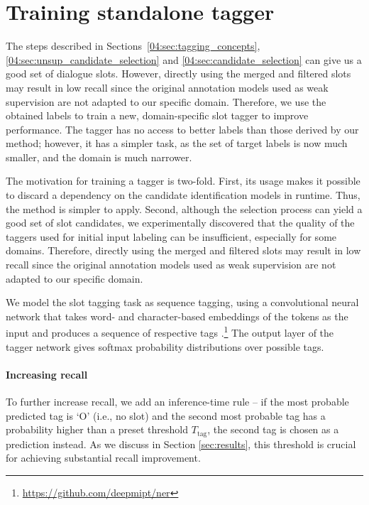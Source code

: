 \section{Training standalone tagger}
\label{04:sec:training_tagger}
The steps described in Sections~\ref{04:sec:tagging_concepts}, \ref{04:sec:unsup_candidate_selection} and \ref{04:sec:candidate_selection} can give us a good set of dialogue slots. %
However, directly using the merged and filtered slots may result in low recall since the original annotation models used as weak supervision are not adapted to our specific domain.
Therefore, we use the obtained labels to train a new, domain-specific slot tagger to improve performance.
The tagger has no access to better labels than those derived by our method; however, it has a simpler task, as the set of target labels is now much smaller, and the domain is much narrower.

The motivation for training a tagger is two-fold.
First, its usage makes it possible to discard a dependency on the candidate identification models in runtime.
Thus, the method is simpler to apply. 
Second, although the selection process can yield a good set of slot candidates, we experimentally discovered that the quality of the taggers used for initial input labeling can be insufficient, especially for some domains.
Therefore, directly using the merged and filtered slots may result in low recall since the original annotation models used as weak supervision are not adapted to our specific domain.

We model the slot tagging task as sequence tagging, using a convolutional neural network that takes word- and character-based embeddings of the tokens as the input and produces a sequence of respective tags \cite{lample2016neural}.\footnote{\url{https://github.com/deepmipt/ner}}
The output layer of the tagger network gives softmax probability distributions over possible tags.

\paragraph{Increasing recall} To further increase recall, we add an inference-time rule -- if the most probable predicted tag is `O' (i.e., no slot) and the second most probable tag has a probability higher than a preset threshold $T_{\text{tag}}$, the second tag is chosen as a prediction instead.
As we discuss in Section \ref{sec:results}, this threshold is crucial for achieving substantial recall improvement.

